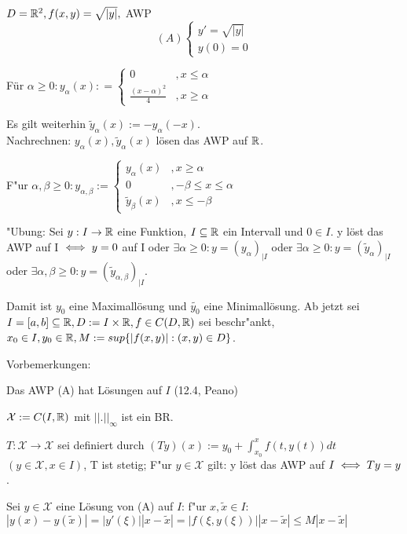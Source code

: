 \documentclass[a4paper,twoside,DIV15,BCOR12mm]{scrbook}
\begin{document}
\begin{beispiel}
$D = \mathbb{R}^2, f(x,y) = \sqrt{|y|},$ AWP \[(A) \begin{cases} y' = \sqrt{|y|} \\ y(0) =0 \end{cases}\]

Für $\alpha \geq 0: y_{\alpha}(x) : = \begin{cases} 0 &, x \leq \alpha \\ \frac{(x-\alpha)^2}{4} &, x \geq \alpha \end{cases} $

Es gilt weiterhin $\tilde{y}_{\alpha}(x) := -y_{\alpha}(-x)$. \\
Nachrechnen: $y_{\alpha}(x), \tilde{y}_{\alpha}(x)$ lösen das AWP auf $\mathbb{R}$.

F"ur $\alpha, \beta \geq 0: y_{\alpha,\beta} := 
\begin{cases}  y_{\alpha}(x) &, x \geq \alpha \\ 0 &, -\beta \leq x \leq \alpha \\ \tilde{y}_{\beta}(x) &, x \leq -\beta  \end{cases}$

"Ubung: Sei $y: I \to \mathbb{R}$ eine Funktion, $I \subseteq \mathbb{R}$ ein Intervall und $0 \in I$.
y löst das AWP auf I $\iff y = 0$ auf I oder $\exists \alpha \geq 0: y = (y_{\alpha})_{|I}$ oder 
$\exists \alpha \geq 0: y = (\tilde{y}_{\alpha})_{|I}$ oder $\exists \alpha, \beta \geq 0: y = (\tilde{y}_{\alpha,\beta})_{|I}.$

Damit ist $y_0$ eine Maximallösung  und $\tilde{y_0}$ eine Minimallösung. 
Ab jetzt sei $I = [a,b] \subseteq \mathbb{R}, D := I \times \mathbb{R}, f \in C(D,\mathbb{R})$ sei beschr"ankt, $x_0 \in I, y_0 \in \mathbb{R}, 
M := sup\{ |f(x,y)| : (x,y) \in D \}$.
\end{beispiel}

Vorbemerkungen: 
\begin{liste}
\item Das AWP (A) hat Lösungen auf $I$ (12.4, Peano)
\item $\mathcal{X} := C(I,\mathbb{R})$ mit $||.||_{\infty}$ ist ein BR.
\item $T:\mathcal{X} \to \mathcal{X}$ sei definiert durch $(Ty)(x) := y_0 + \int_{x_0}^{x} f(t,y(t)) dt$  $(y\in \mathcal{X}, x\in I)$, T ist stetig;
F"ur $y \in \mathcal{X}$ gilt: y löst das AWP auf $I \iff Ty = y$.
\item Sei $y \in \mathcal{X}$ eine Lösung von (A) auf $I$: f"ur $x, \tilde{x} \in I$:
$| y(x) - y(\tilde{x}) | = |y'(\xi)| | x - \tilde{x}| = |f(\xi,y(\xi))| | x - \tilde{x}| \leq M | x - \tilde{x}|$
\end{liste}
\end{document}
